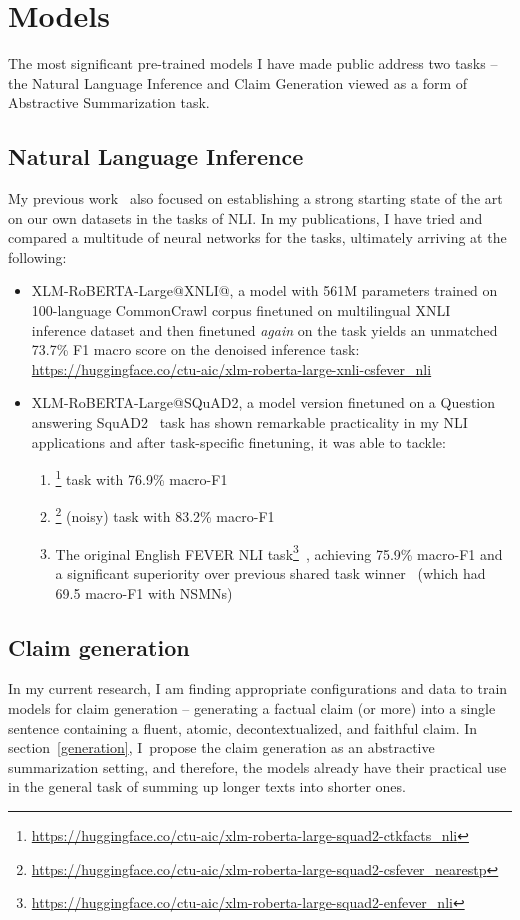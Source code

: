 \section{Models}
\label{sec:models}
The most significant pre-trained models I have made public address two tasks -- the Natural Language Inference and Claim Generation viewed as a form of Abstractive Summarization task.
\subsection{Natural Language Inference}
My previous work~\cite{diplomka, lrev} also focused on establishing a strong starting state of the art on our own datasets in the tasks of NLI.
In my publications, I have tried and compared a multitude of neural networks for the tasks, ultimately arriving at the following:
\begin{itemize}
    \item {\techbf XLM-RoBERTA-Large@XNLI@\FCZNLI}, a model with 561M parameters trained on 100-language CommonCrawl corpus finetuned on multilingual XNLI~\cite{conneau2018xnli} inference dataset and then finetuned \textit{again} on the \FCZNLI task yields an unmatched 73.7\% F1 macro score on the denoised \FCZNLI inference task: \url{https://huggingface.co/ctu-aic/xlm-roberta-large-xnli-csfever_nli}
    \item {\techbf XLM-RoBERTA-Large@SQuAD2}, a model version finetuned on a Question answering SquAD2~\cite{squad} task has shown remarkable practicality in my NLI applications and after task-specific finetuning, it was able to tackle:
    \begin{enumerate}
        \item \CTKNLI\footnote{\url{https://huggingface.co/ctu-aic/xlm-roberta-large-squad2-ctkfacts_nli}} task with 76.9\% macro-F1
        \item \FCZ\footnote{\url{https://huggingface.co/ctu-aic/xlm-roberta-large-squad2-csfever_nearestp}} (noisy) task with 83.2\% macro-F1
        \item The original English FEVER NLI task\footnote{\url{https://huggingface.co/ctu-aic/xlm-roberta-large-squad2-enfever_nli}}~\cite{fever,nie2019combining}, achieving 75.9\% macro-F1 and a significant superiority over previous shared task winner~\cite{nie2019combining} (which had 69.5 macro-F1 with NSMNs)
    \end{enumerate}
\end{itemize}

\subsection{Claim generation}
In my current research, I am finding appropriate configurations and data to train models for claim generation -- generating a factual claim (or more) into a single sentence containing a fluent, atomic, decontextualized, and faithful claim.
In section~\ref{generation}, I~propose the claim generation as an abstractive summarization setting, and therefore, the models already have their practical use in the general task of summing up longer texts into shorter ones.


